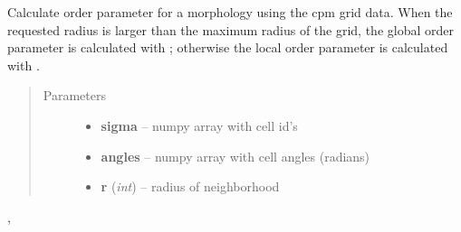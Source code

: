 \documentclass[letterpaper,10pt,english]{sphinxmanual}
\begin{document}
\begin{fulllineitems}
\label{AnalysisUtils:AnalysisUtils.getOrderParameter}
Calculate order parameter for a morphology using the cpm grid data. When the requested radius is larger than the maximum radius of the grid, the global order parameter is calculated with {\hyperref[AnalysisUtils:AnalysisUtils.getGlobalOrderParameter]{}}; otherwise the local order parameter is calculated with {\hyperref[AnalysisUtils:AnalysisUtils.getLocalOrderParameter]{}}.
\begin{quote}\begin{description}
\item[{Parameters}] \leavevmode\begin{itemize}
\item {} 
\textbf{sigma} -- numpy array with cell id's

\item {} 
\textbf{angles} -- numpy array with cell angles (radians)

\item {} 
\textbf{r} (\emph{int}) -- radius of neighborhood

\end{itemize}

\end{description}\end{quote}




{\hyperref[AnalysisUtils:AnalysisUtils.getLocalOrderParameter]{}}, {\hyperref[AnalysisUtils:AnalysisUtils.getGlobalOrderParameter]{}}



\end{fulllineitems}

\end{document}
